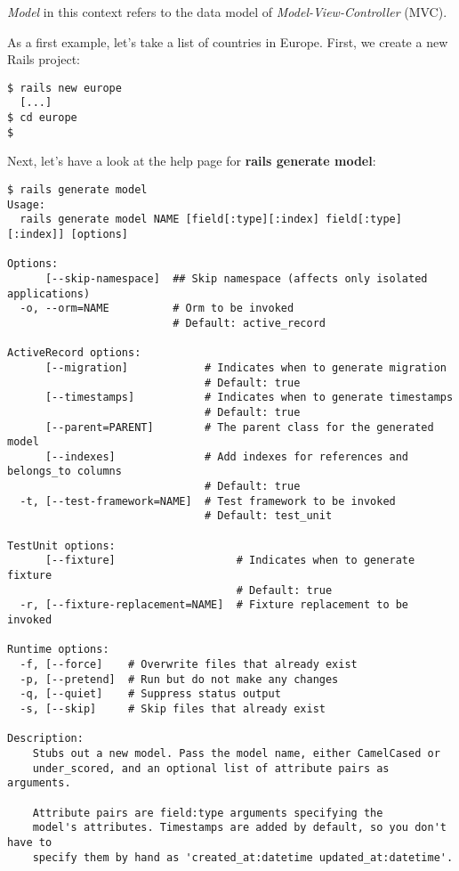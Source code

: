 \documentclass[a4paper]{book}
\begin{document}
\emph{Model} in this context refers to the data model of \emph{Model-View-Controller} (MVC).

As a first example, let's take a list of countries in Europe. First, we create a new Rails project:

\begin{shaded}\begin{verbatim}
$ rails new europe
  [...]
$ cd europe
$
\end{verbatim}\end{shaded}

Next, let's have a look at the help page for \textbf{rails generate model}:

\begin{shaded}\begin{verbatim}
$ rails generate model
Usage:
  rails generate model NAME [field[:type][:index] field[:type][:index]] [options]

Options:
      [--skip-namespace]  ## Skip namespace (affects only isolated applications)
  -o, --orm=NAME          # Orm to be invoked
                          # Default: active_record

ActiveRecord options:
      [--migration]            # Indicates when to generate migration
                               # Default: true
      [--timestamps]           # Indicates when to generate timestamps
                               # Default: true
      [--parent=PARENT]        # The parent class for the generated model
      [--indexes]              # Add indexes for references and belongs_to columns
                               # Default: true
  -t, [--test-framework=NAME]  # Test framework to be invoked
                               # Default: test_unit

TestUnit options:
      [--fixture]                   # Indicates when to generate fixture
                                    # Default: true
  -r, [--fixture-replacement=NAME]  # Fixture replacement to be invoked

Runtime options:
  -f, [--force]    # Overwrite files that already exist
  -p, [--pretend]  # Run but do not make any changes
  -q, [--quiet]    # Suppress status output
  -s, [--skip]     # Skip files that already exist

Description:
    Stubs out a new model. Pass the model name, either CamelCased or
    under_scored, and an optional list of attribute pairs as arguments.

    Attribute pairs are field:type arguments specifying the
    model's attributes. Timestamps are added by default, so you don't have to
    specify them by hand as 'created_at:datetime updated_at:datetime'.


\end{verbatim}
\end{shaded}
\end{document}
